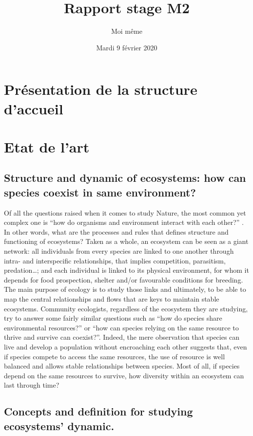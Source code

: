 \documentclass[a4paper, 12pt]{article}
\title{Rapport stage M2}
\author{Moi même}
\date{Mardi 9 février 2020}
\begin{document}
\maketitle
\newpage
\tableofcontents
\newpage


\section{Présentation de la structure d'accueil}
\section{Etat de l'art}

\subsection{Structure and dynamic of ecosystems: how can species coexist in same environment?} 

Of all the questions raised when it comes to study Nature, the most common yet complex one is “how do organisms and environment interact with each other?” \citep{sutherland2013}. In other words, what are the processes and rules that defines structure and functioning of ecosystems? Taken as a whole, an ecosystem can be seen as a giant network: all individuals from every species are linked to one another through intra- and interspecific relationships, that implies competition, parasitism, predation…; and each individual is linked to its physical environment, for whom it depends for food prospection, shelter and/or favourable conditions for breeding. The main purpose of ecology is to study those links and ultimately, to be able to map the central relationships and flows that are keys to maintain stable ecosystems.  Community ecologists, regardless of the ecosystem they are studying, try to answer some fairly similar questions such as “how do species share environmental resources?” or “how can species relying on the same resource to thrive and survive can coexist?”. Indeed, the mere observation that species can live and develop a population without encroaching each other suggests that, even if species compete to access the same resources, the use of resource is well balanced and allows stable relationships between species. Most of all, if species depend on the same resources to survive, how diversity within an ecosystem can last through time?


\subsection{Concepts and definition for studying ecosystems’ dynamic.}
 
\end{document}
